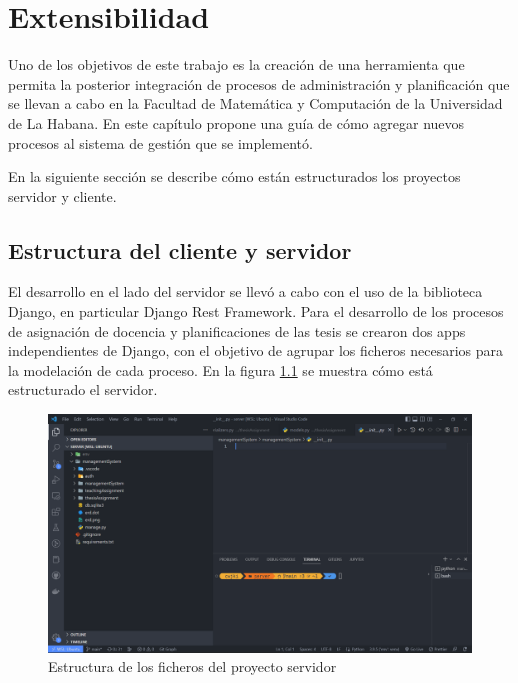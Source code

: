 \chapter{Extensibilidad}\label{chapter:extensibility}
Uno de los objetivos de este trabajo es la creación de una herramienta que 
permita la posterior integración de procesos de administración y planificación 
que se llevan a cabo en la Facultad de Matemática y Computación de la Universidad
de La Habana. 
En este capítulo propone una guía de cómo agregar nuevos 
procesos al sistema de gestión que se implementó.

En la siguiente sección se describe cómo están estructurados los proyectos 
servidor y cliente. 

\section{Estructura del cliente y servidor}
El desarrollo en el lado del servidor se llevó a cabo con el  
uso de la biblioteca Django, en particular Django Rest Framework.
Para el desarrollo de los procesos de asignación de docencia y planificaciones de las 
tesis se crearon dos apps independientes de Django, con el objetivo de agrupar los ficheros 
necesarios para la modelación de cada proceso. 
En la figura \ref{img-server-structure} se muestra cómo está estructurado el servidor.










\begin{figure}[H]
    \includegraphics[scale=0.3]{Graphics/Extensibility/server-structure.png}
    \caption{Estructura de los ficheros del proyecto servidor}
    \label{img-server-structure}
\end{figure}


